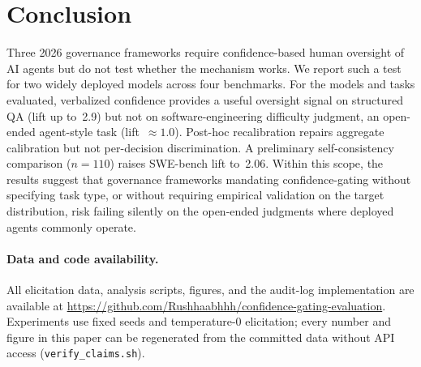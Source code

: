 \documentclass[10pt,twocolumn]{article}
\begin{document}
\section{Conclusion}

Three 2026 governance frameworks require confidence-based human oversight of AI
agents but do not test whether the mechanism works. We report such a test for
two widely deployed models across four benchmarks. For the models and tasks
evaluated, verbalized confidence provides a useful oversight signal on
structured QA (lift up to~2.9) but not on software-engineering difficulty
judgment, an open-ended agent-style task (lift~$\approx1.0$). Post-hoc
recalibration repairs aggregate calibration but not per-decision
discrimination. A preliminary self-consistency comparison ($n{=}110$) raises
SWE-bench lift to~2.06. Within this scope, the results suggest that governance
frameworks mandating confidence-gating without specifying task type, or without
requiring empirical validation on the target distribution, risk failing
silently on the open-ended judgments where deployed agents commonly operate.

\paragraph{Data and code availability.}
All elicitation data, analysis scripts, figures, and the audit-log
implementation are available at
\url{https://github.com/Rushhaabhhh/confidence-gating-evaluation}. Experiments
use fixed seeds and temperature-0 elicitation; every number and figure in this
paper can be regenerated from the committed data without API access
(\texttt{verify\_claims.sh}).
\end{document}

